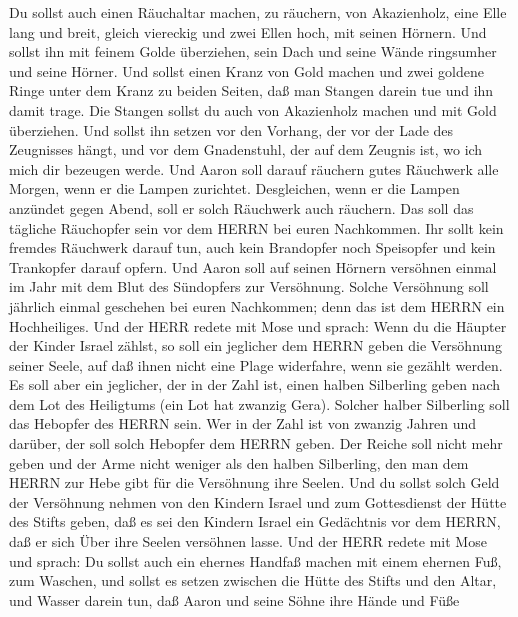  Du sollst auch einen Räuchaltar machen, zu räuchern, von
Akazienholz,  eine Elle lang und breit, gleich viereckig und
zwei Ellen hoch, mit seinen Hörnern.  Und sollst ihn mit
feinem Golde überziehen, sein Dach und seine Wände ringsumher und seine
Hörner. Und sollst einen Kranz von Gold machen  und zwei
goldene Ringe unter dem Kranz zu beiden Seiten, daß man Stangen darein
tue und ihn damit trage.  Die Stangen sollst du auch von
Akazienholz machen und mit Gold überziehen.  Und sollst ihn
setzen vor den Vorhang, der vor der Lade des Zeugnisses hängt, und vor
dem Gnadenstuhl, der auf dem Zeugnis ist, wo ich mich dir bezeugen
werde.  Und Aaron soll darauf räuchern gutes Räuchwerk alle
Morgen, wenn er die Lampen zurichtet.  Desgleichen, wenn er
die Lampen anzündet gegen Abend, soll er solch Räuchwerk auch räuchern.
Das soll das tägliche Räuchopfer sein vor dem HERRN bei euren
Nachkommen.  Ihr sollt kein fremdes Räuchwerk darauf tun,
auch kein Brandopfer noch Speisopfer und kein Trankopfer darauf opfern.
 Und Aaron soll auf seinen Hörnern versöhnen einmal im Jahr
mit dem Blut des Sündopfers zur Versöhnung. Solche Versöhnung soll
jährlich einmal geschehen bei euren Nachkommen; denn das ist dem HERRN
ein Hochheiliges.  Und der HERR redete mit Mose und sprach:
 Wenn du die Häupter der Kinder Israel zählst, so soll ein
jeglicher dem HERRN geben die Versöhnung seiner Seele, auf daß ihnen
nicht eine Plage widerfahre, wenn sie gezählt werden.  Es
soll aber ein jeglicher, der in der Zahl ist, einen halben Silberling
geben nach dem Lot des Heiligtums (ein Lot hat zwanzig Gera). Solcher
halber Silberling soll das Hebopfer des HERRN sein.  Wer in
der Zahl ist von zwanzig Jahren und darüber, der soll solch Hebopfer dem
HERRN geben.  Der Reiche soll nicht mehr geben und der Arme
nicht weniger als den halben Silberling, den man dem HERRN zur Hebe gibt
für die Versöhnung ihre Seelen.  Und du sollst solch Geld
der Versöhnung nehmen von den Kindern Israel und zum Gottesdienst der
Hütte des Stifts geben, daß es sei den Kindern Israel ein Gedächtnis vor
dem HERRN, daß er sich Über ihre Seelen versöhnen lasse. 
Und der HERR redete mit Mose und sprach:  Du sollst auch
ein ehernes Handfaß machen mit einem ehernen Fuß, zum Waschen, und
sollst es setzen zwischen die Hütte des Stifts und den Altar, und Wasser
darein tun,  daß Aaron und seine Söhne ihre Hände und Füße
